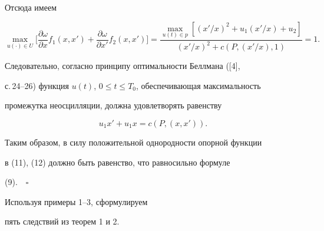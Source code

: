 Отсюда имеем 


$$ 


\max_{u(\cdot)\in U}\bigg[ 


\frac{\partial\omega}{\partial x}f_1(x,x')+ 


\frac{\partial\omega}{\partial x'}f_2(x,x')\bigg]= 


\frac{\max\limits_{u(t)\in p}[(x'/x)^2+u_1(x'/x)+u_2]} 


{(x'/x)^2+c(P,(x'/x),1)}=1. 


$$ 


 


Следовательно, согласно принципу оптимальности Беллмана ([4], 


с.\,24--26) функция $u(t)$, $0\le t\le T_0$, обеспечивающая максимальность 


промежутка неосцилляции, должна удовлетворять равенству 


$$ 


u_1x'+u_1x=c(P,(x,x')). 


$$ 


 


Таким образом, в силу положительной однородности опорной функции 


в (11), (12) должно быть равенство, что равносильно формуле 


(9).$\quad\square$ 


\medskip 


 


Используя примеры 1--3, сформулируем 


пять следствий из теорем 1 и 2. 


 


